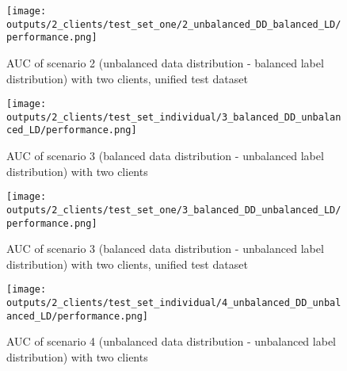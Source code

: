 

\begin{figure}[htb!]
    \centering
    \texttt{[image: outputs/2\_clients/test\_set\_one/2\_unbalanced\_DD\_balanced\_LD/performance.png]}
    \caption{AUC of scenario 2 (unbalanced data distribution - balanced label distribution) with two clients, unified test dataset}
    \label{fig:auc_box_2_clients_scenario_2_uni}
\end{figure}



\begin{figure}[htb!]
    \centering
    \texttt{[image: outputs/2\_clients/test\_set\_individual/3\_balanced\_DD\_unbalanced\_LD/performance.png]}
    \caption{AUC of scenario 3 (balanced data distribution - unbalanced label distribution) with two clients}
    \label{fig:auc_box_2_clients_scenario_3}
\end{figure}



\begin{figure}[htb!]
    \centering
    \texttt{[image: outputs/2\_clients/test\_set\_one/3\_balanced\_DD\_unbalanced\_LD/performance.png]}
    \caption{AUC of scenario 3 (balanced data distribution - unbalanced label distribution) with two clients, unified test dataset}
    \label{fig:auc_box_2_clients_scenario_3_uni}
\end{figure}



\begin{figure}[htb!]
    \centering
    \texttt{[image: outputs/2\_clients/test\_set\_individual/4\_unbalanced\_DD\_unbalanced\_LD/performance.png]}
    \caption{AUC of scenario 4 (unbalanced data distribution - unbalanced label distribution) with two clients}
    \label{fig:auc_box_2_clients_scenario_4}
\end{figure}

